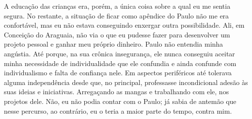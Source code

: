 A educação das crianças era, porém, a única coisa sobre a qual eu me sentia segura.
No restante, a situação de ficar como apêndice do Paulo não me era confortável, mas eu não estava conseguindo enxergar outra possibilidade.
Ali, em Conceição do Araguaia, não via o que eu pudesse fazer para desenvolver um projeto pessoal e ganhar meu próprio dinheiro.
Paulo não entendia minha angústia.
Até porque, na sua crônica insegurança, ele nunca conseguiu aceitar minha necessidade de individualidade que ele confundia e ainda confunde com individualismo e falta de confiança nele.
Em aspectos periféricos até tolerava alguma independência desde que, no principal, professasse incondicional adesão às suas ideias e iniciativas.
Arregaçando as mangas e trabalhando com ele, nos projetos dele.
Não, eu não podia contar com o Paulo; já sabia de antemão que nesse percurso, ao contrário, eu o teria a maior parte do tempo, contra mim.

